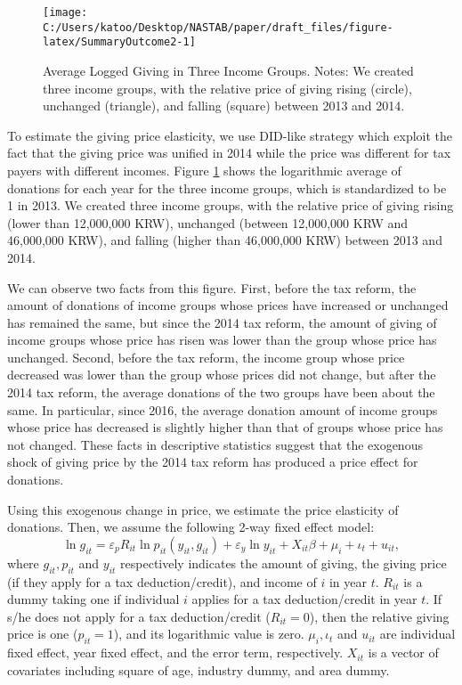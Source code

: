 \documentclass[
  11pt,
  a4paper,
]{article}
\begin{document}
\begin{figure}[t]

{\centering \texttt{[image: C:/Users/katoo/Desktop/NASTAB/paper/draft\_files/figure-latex/SummaryOutcome2-1]} 

}

\caption{Average Logged Giving in Three Income Groups. Notes: We created three income groups, with the relative price of giving rising (circle), unchanged (triangle), and falling (square) between 2013 and 2014.}\label{fig:SummaryOutcome2}
\end{figure}

To estimate the giving price elasticity,
we use DID-like strategy which exploit the fact that the giving price was unified in 2014
while the price was different for tax payers with different incomes.
Figure \ref{fig:SummaryOutcome2} shows the logarithmic average of donations for each year for the three income groups, which is standardized to be 1 in 2013.
We created three income groups, with the relative price of giving rising (lower than 12,000,000 KRW),
unchanged (between 12,000,000 KRW and 46,000,000 KRW),
and falling (higher than 46,000,000 KRW) between 2013 and 2014.

We can observe two facts from this figure.
First, before the tax reform, the amount of donations of income groups whose prices have increased or unchanged has remained the same,
but since the 2014 tax reform, the amount of giving of income groups whose price has risen was lower than the group whose price has unchanged.
Second, before the tax reform, the income group whose price decreased was lower than the group whose prices did not change,
but after the 2014 tax reform, the average donations of the two groups have been about the same.
In particular, since 2016,
the average donation amount of income groups whose price has decreased is slightly higher than that of groups whose price has not changed.
These facts in descriptive statistics suggest that
the exogenous shock of giving price by the 2014 tax reform has produced a price effect for donations.

Using this exogenous change in price, we estimate the price elasticity of donations.
Then, we assume the following 2-way fixed effect model:
\begin{equation}
    \ln g_{it} = \varepsilon_p R_{it} \ln p_{it}(y_{it}, g_{it}) + \varepsilon_y \ln y_{it} 
    + X_{it}\beta +\mu_i +\iota_t +u_{it}, \label{eq:intensive}
\end{equation}
where \(g_{it}, p_{it}\) and \(y_{it}\) respectively indicates
the amount of giving, the giving price (if they apply for a tax deduction/credit), and income of \(i\) in year \(t\).
\(R_{it}\) is a dummy taking one if individual \(i\) applies for a tax deduction/credit in year \(t\).
If s/he does not apply for a tax deduction/credit (\(R_{it} = 0\)), then the relative giving price is one (\(p_{it} = 1\)),
and its logarithmic value is zero.
\(\mu_i, \iota_t\) and \(u_{it}\) are individual fixed effect, year fixed effect, and the error term, respectively.
\(X_{it}\) is a vector of covariates including square of age, industry dummy, and area dummy.
\end{document}

